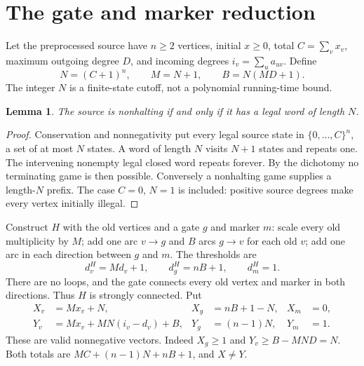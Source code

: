 \documentclass[11pt]{article}
\newtheorem{lemma}[theorem]{Lemma}
\begin{document}
\section{The gate and marker reduction}
Let the preprocessed source have $n\geq2$ vertices, initial $x\geq0$,
total $C=\sum_v x_v$, maximum outgoing degree $D$, and incoming degrees
$i_v=\sum_u a_{uv}$. Define
\begin{equation}\label{eq:parameters}
 N=(C+1)^n,\qquad M=N+1,\qquad B=N(MD+1).
\end{equation}
The integer $N$ is a finite-state cutoff, not a polynomial running-time
bound.
\begin{lemma}\label{lem:cutoff}
The source is nonhalting if and only if it has a legal word of length $N$.
\end{lemma}
\begin{proof}
Conservation and nonnegativity put every legal source state in
$\{0,\ldots,C\}^n$, a set of at most $N$ states. A word of length $N$
visits $N+1$ states and repeats one. The intervening nonempty legal
closed word repeats forever. By the dichotomy no terminating game is
then possible. Conversely a nonhalting game supplies a length-$N$
prefix. The case $C=0$, $N=1$ is included: positive source degrees
make every vertex initially illegal.
\end{proof}

Construct $H$ with the old vertices and a gate $g$ and marker $m$:
scale every old multiplicity by $M$; add one arc $v\to g$ and $B$
arcs $g\to v$ for each old $v$; add one arc in each direction between
$g$ and $m$. The thresholds are
\[
 d^H_v=Md_v+1,\qquad d^H_g=nB+1,\qquad d^H_m=1.
\]
There are no loops, and the gate connects every old vertex and marker
in both directions. Thus $H$ is strongly connected. Put
\begin{align}
 X_v&=Mx_v+N,& X_g&=nB+1-N,& X_m&=0,\label{eq:X}\\
 Y_v&=Mx_v+MN(i_v-d_v)+B,& Y_g&=(n-1)N,&Y_m&=1.\label{eq:Y}
\end{align}
These are valid nonnegative vectors. Indeed $X_g\geq1$ and
$Y_v\geq B-MND=N$. Both totals are
$MC+(n-1)N+nB+1$, and $X\ne Y$.
\end{document}
